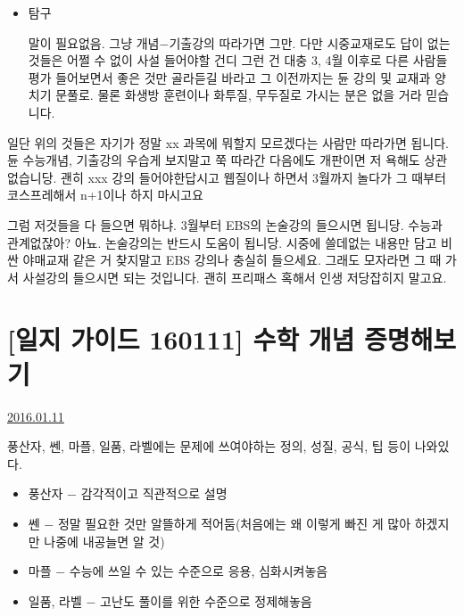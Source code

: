 \begin{itemize}
    \item 탐구
    \vspace{5mm}

    말이 필요없음. 그냥 개념$-$기출강의 따라가면 그만.
    다만 시중교재로도 답이 없는 것들은 어쩔 수 없이 사설 들어야할 건디
    그런 건 대충 3, 4월 이후로 다른 사람들 평가 들어보면서 좋은 것만 골라듣길 바라고
    그 이전까지는 듄 강의 및 교재과 양치기 문풀로.
    물론 화생방 훈련이나 화투질, 무두질로 가시는 분은 없을 거라 믿습니다.
    \vspace{5mm}
\end{itemize}

일단 위의 것들은 자기가 정말 xx 과목에 뭐할지 모르겠다는 사람만 따라가면 됩니다.
듄 수능개념, 기출강의 우습게 보지말고 쭉 따라간 다음에도 개판이면 저 욕해도 상관없습니당.
괜히 xxx 강의 들어야한답시고 웹질이나 하면서 3월까지 놀다가 그 때부터 코스프레해서 n+1이나 하지 마시고요
\vspace{5mm}

그럼 저것들을 다 들으면 뭐하냐.
3월부터 EBS의 논술강의 들으시면 됩니당.
수능과 관계없잖아?
아뇨. 논술강의는 반드시 도움이 됩니당.
시중에 쓸데없는 내용만 담고 비싼 야매교재 같은 거 찾지말고 EBS 강의나 충실히 들으세요.
그래도 모자라면 그 때 가서 사설강의 들으시면 되는 것입니다. 괜히 프리패스 혹해서 인생 저당잡히지 말고요.
\vspace{5mm}









\section{[일지 가이드 160111] 수학 개념 증명해보기}
\href{https://www.kockoc.com/Apoc/584086}{2016.01.11}

\vspace{5mm}

풍산자, 쎈, 마플, 일품, 라벨에는 문제에 쓰여야하는 정의, 성질, 공식, 팁 등이 나와있다.
\vspace{5mm}

\begin{itemize}
    \item 풍산자 $-$ 감각적이고 직관적으로 설명
    \item 쎈 $-$ 정말 필요한 것만 알뜰하게 적어둠(처음에는 왜 이렇게 빠진 게 많아 하겠지만 나중에 내공늘면 알 것)
    \item 마플 $-$ 수능에 쓰일 수 있는 수준으로 응용, 심화시켜놓음
    \item 일품, 라벨 $-$ 고난도 풀이를 위한 수준으로 정제해놓음
\end{itemize}
\vspace{5mm}


